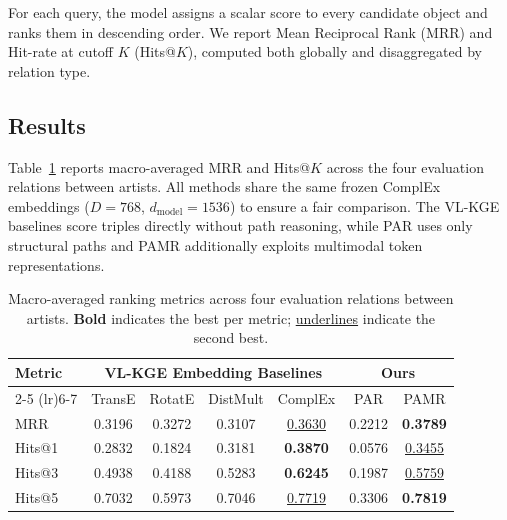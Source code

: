 \documentclass[runningheads]{llncs}
\begin{document}
For each query, the model assigns a scalar score to every candidate
object and ranks them in descending order. We report Mean Reciprocal
Rank (MRR) and Hit-rate at cutoff $K$ (Hits@$K$), computed both
globally and disaggregated by relation type.

\subsection{Results}
\label{sec:results}

Table~\ref{tab:results} reports macro-averaged MRR and Hits@$K$ across
the four evaluation relations between artists. All methods share the same
frozen ComplEx embeddings ($D = 768$, $d_{\text{model}} = 1536$) to
ensure a fair comparison. The VL-KGE baselines score triples directly
without path reasoning, while PAR uses only structural paths and PAMR
additionally exploits multimodal token representations.

\begin{table}[t]
  \centering
  \setlength{\tabcolsep}{2pt}
  \renewcommand{\arraystretch}{1.15}
  {\footnotesize
    \begin{tabular}{l|cccc|cc}
      \toprule
      \multirow{2}{*}{Metric} &
      \multicolumn{4}{|c|}{VL-KGE Embedding Baselines} &
      \multicolumn{2}{|c|}{Ours} \\
      \cmidrule(lr){2-5} \cmidrule(lr){6-7}
      & TransE & RotatE & DistMult & ComplEx & PAR & PAMR \\
      \midrule
      MRR  & 0.3196 & 0.3272 & 0.3107 & \underline{0.3630} & 0.2212 & \textbf{0.3789} \\
      Hits@1 & 0.2832 & 0.1824 & 0.3181 & \textbf{0.3870} & 0.0576 & \underline{0.3455} \\
      Hits@3 & 0.4938 & 0.4188 & 0.5283 & \textbf{0.6245} & 0.1987 & \underline{0.5759} \\
      Hits@5 & 0.7032 & 0.5973 & 0.7046 & \underline{0.7719} & 0.3306 & \textbf{0.7819} \\
      \bottomrule
  \end{tabular}}
  \caption{Macro-averaged ranking metrics across four evaluation
    relations between artists. \textbf{Bold} indicates the best per metric;
  \underline{underlines} indicate the second best.}
  \label{tab:results}
\end{table}
\end{document}
